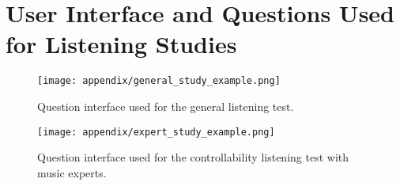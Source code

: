 \documentclass[11pt]{article}
\begin{document}
%
 












































































\appendix



\clearpage
\onecolumn
\FloatBarrier
\section{User Interface and Questions Used for Listening Studies}
\FloatBarrier
\begin{figure}[h]
    \centering
    \texttt{[image: appendix/general\_study\_example.png]}
    \caption{Question interface used for the general listening test. }
    \label{appfig:general_study}
\end{figure}

\begin{figure}[h]
    \centering
    \texttt{[image: appendix/expert\_study\_example.png]}
    \caption{Question interface used for the controllability listening test with music experts. }
    \label{appfig:expert_study}
\end{figure}
\end{document}
